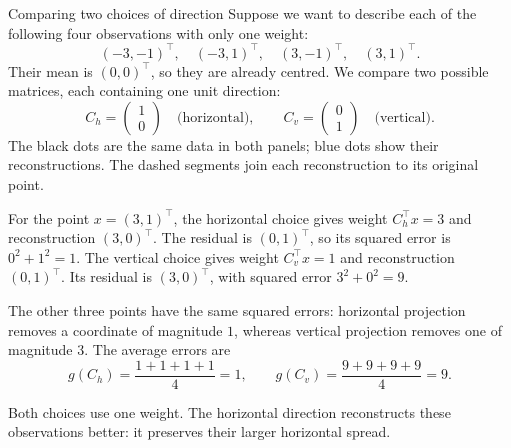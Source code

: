 \begin{framedexample}{Comparing two choices of direction}
Suppose we want to describe each of the following four observations
with only one weight:
\[
  (-3,-1)^\top,\quad (-3,1)^\top,\quad
  (3,-1)^\top,\quad (3,1)^\top.
\]
Their mean is $(0,0)^\top$, so they are already centred. We compare
two possible matrices, each containing one unit direction:
\[
  C_h=\begin{pmatrix}1\\0\end{pmatrix}
  \quad\text{(horizontal)},\qquad
  C_v=\begin{pmatrix}0\\1\end{pmatrix}
  \quad\text{(vertical)}.
\]
The black dots are the same data in both panels; blue dots show their
reconstructions. The dashed segments join each reconstruction to its
original point.

\begin{center}
\end{center}

For the point $x=(3,1)^\top$, the horizontal choice gives weight
$C_h^\top x=3$ and reconstruction $(3,0)^\top$. The residual is
$(0,1)^\top$, so its squared error is $0^2+1^2=1$.
The vertical choice gives weight $C_v^\top x=1$ and reconstruction
$(0,1)^\top$. Its residual is $(3,0)^\top$, with squared error
$3^2+0^2=9$.

The other three points have the same squared errors: horizontal
projection removes a coordinate of magnitude $1$, whereas vertical
projection removes one of magnitude $3$. The average errors are
\[
  g(C_h)=\frac{1+1+1+1}{4}=1,\qquad
  g(C_v)=\frac{9+9+9+9}{4}=9.
\]

Both choices use one weight. The horizontal direction reconstructs
these observations better: it preserves their larger horizontal spread.
\end{framedexample}

